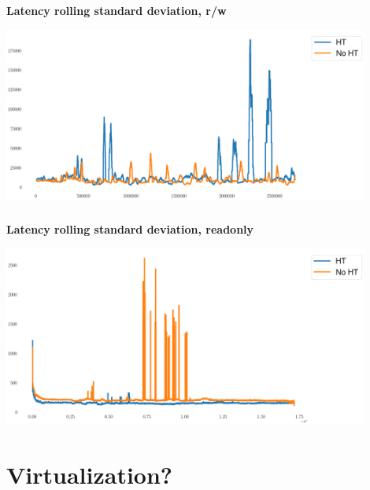 \documentclass[usenames,dvipsnames, 18pt, compress, aspectratio=169]{beamer}
\begin{document}
\begin{frame}
    \frametitle{}
    \begin{center}
    \textbf{Latency rolling standard deviation, r/w}

        \includegraphics[width=0.9\textwidth,center]{hyperthreading.png}

    \end{center}
\end{frame}

\begin{frame}
    \frametitle{}
    \begin{center}
    \textbf{Latency rolling standard deviation, readonly}

        \includegraphics[width=0.9\textwidth,center]{hyperthreading_readonly.png}

    \end{center}
\end{frame}

\fontsize{13pt}{14}\selectfont
\section{Virtualization?}
\fontsize{17pt}{18}\selectfont
\end{document}
